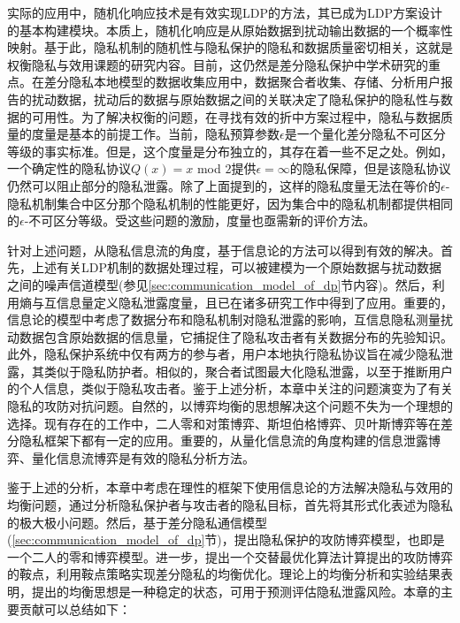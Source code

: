实际的应用中，随机化响应\cite{warner1965randomized}技术是有效实现LDP的方法\cite{kairouz2016extremal,kairouz2016discrete,wang2016using,holohan2017optimal}，其已成为LDP方案设计的基本构建模块。本质上，随机化响应是从原始数据到扰动输出数据的一个概率性映射。基于此，隐私机制的随机性与隐私保护的隐私和数据质量密切相关，这就是权衡隐私与效用课题的研究内容。目前，这仍然是差分隐私保护中学术研究的重点。在差分隐私本地模型的数据收集应用中，数据聚合者收集、存储、分析用户报告的扰动数据\cite{sei2017differential}，扰动后的数据与原始数据之间的关联决定了隐私保护的隐私性与数据的可用性。为了解决权衡的问题，在寻找有效的折中方案过程中，隐私与数据质量的度量是基本的前提工作。当前，隐私预算参数$\epsilon$是一个量化差分隐私不可区分等级的事实标准。但是，这个度量是分布独立的，其存在着一些不足之处。例如，一个确定性的隐私协议$Q(x)=x$ mod $2$提供$\epsilon = \infty$的隐私保障，但是该隐私协议仍然可以阻止部分的隐私泄露\cite{lopuhaa-zwakenberg2019information}。除了上面提到的，这样的隐私度量无法在等价的$\epsilon$-隐私机制集合中区分那个隐私机制的性能更好，因为集合中的隐私机制都提供相同的$\epsilon$-不可区分等级。受这些问题的激励，度量也亟需新的评价方法。

针对上述问题，从隐私信息流的角度，基于信息论的方法可以得到有效的解决\cite{wu2020a}。首先，上述有关LDP机制的数据处理过程，可以被建模为一个原始数据与扰动数据之间的噪声信道模型\cite{xiong2016randomized,kalantari2018robust}(参见\ref{sec:communication_model_of_dp}节内容)。然后，利用熵与互信息量定义隐私泄露度量，且已在诸多研究工作中得到了应用\cite{kairouz2016extremal,calmon2012privacy,sarwate2014a,kalantari2016optimal}。重要的，信息论的模型中考虑了数据分布和隐私机制对隐私泄露的影响，互信息隐私测量扰动数据包含原始数据的信息量，它捕捉住了隐私攻击者有关数据分布的先验知识。此外，隐私保护系统中仅有两方的参与者\cite{dwork2014algorithmic}，用户本地执行隐私协议旨在减少隐私泄露，其类似于隐私防护者。相似的，聚合者试图最大化隐私泄露，以至于推断用户的个人信息，类似于隐私攻击者。鉴于上述分析，本章中关注的问题演变为了有关隐私的攻防对抗问题。自然的，以博弈均衡的思想解决这个问题不失为一个理想的选择。现有存在的工作中，二人零和对策博弈\cite{hsu2013differential,alvim2017information,alvim2018leakage,jin2019on}、斯坦伯格博弈\cite{fioretto2020differential}、贝叶斯博弈\cite{cui2019improving}等在差分隐私框架下都有一定的应用。重要的，从量化信息流的角度构建的信息泄露博弈\cite{alvim2017information,alvim2018leakage}、量化信息流博弈\cite{jin2019on}是有效的隐私分析方法。


鉴于上述的分析，本章中考虑在理性的框架下使用信息论的方法解决隐私与效用的均衡问题，通过分析隐私保护者与攻击者的隐私目标，首先将其形式化表述为隐私的极大极小问题。然后，基于差分隐私通信模型(\ref{sec:communication_model_of_dp}节)，提出隐私保护的攻防博弈模型，也即是一个二人的零和博弈模型。进一步，提出一个交替最优化算法计算提出的攻防博弈的鞍点，利用鞍点策略实现差分隐私的均衡优化。理论上的均衡分析和实验结果表明，提出的均衡思想是一种稳定的状态，可用于预测评估隐私泄露风险。本章的主要贡献可以总结如下：

